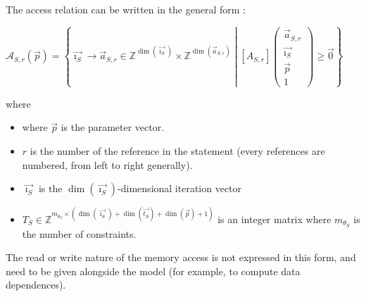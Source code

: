 \documentclass[paper=a4, fontsize=11.5pt]{scrartcl}
\numberwithin{equation}{section}        %
\numberwithin{figure}{section}          %
\numberwithin{table}{section}               %
\begin{document}
        The access relation can be written in the general form :
        \begin{center}
            $\mathcal{A}_{S,r}(\vec{p}) = 
            \left\{
                \vec{\imath_S} \to \vec{a}_{S,r} \in \mathbb{Z}^{\dim(\vec{\imath_S})}\times\mathbb{Z}^{\dim(\vec{a}_{S,r})}
                \middle|
                \left[A_{S,r}\right]\left(\begin{array}{c}\vec{a}_{S,r}\\\vec{\imath_S}\\\vec{p}\\1\end{array}\right)
                \geq \vec{0}
            \right\}$
        \end{center}
        where 
        \begin{itemize}
            \item where $\vec{p}$ is the parameter vector.
            \item $r$ is the number of the reference in the statement (every references are
                numbered, from left to right generally).
            \item $\vec{\imath_S}$ is the $\dim(\vec{\imath_S})$-dimensional iteration vector
            \item $T_S \in \mathbb{Z}^{m_{\theta_S}\times(\dim(\vec{\imath_S})+\dim(\vec{t_S})+\dim(\vec{p})+1)}$
                is an integer matrix where $m_{\theta_S}$ is the number of constraints.
        \end{itemize}

        The read or write nature of the memory access is not expressed in this form,
        and need to be given alongside the model (for example, to compute data dependences).

\end{document}
